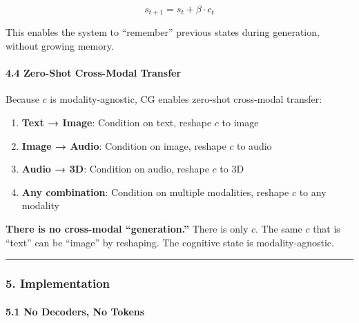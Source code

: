 \documentclass[
  11pt,
  a4paper,
]{article}
\providecommand{\tightlist}{%
  \setlength{\itemsep}{0pt}\setlength{\parskip}{0pt}}
\begin{document}
\[
s_{t+1} = s_t + \beta \cdot c_t
\]

This enables the system to ``remember'' previous states during
generation, without growing memory.

\paragraph{4.4 Zero-Shot Cross-Modal
Transfer}\label{zero-shot-cross-modal-transfer}

Because \(c\) is modality-agnostic, CG enables zero-shot cross-modal
transfer:

\begin{enumerate}
\def\labelenumi{\arabic{enumi}.}
\tightlist
\item
  \textbf{Text → Image}: Condition on text, reshape \(c\) to image
\item
  \textbf{Image → Audio}: Condition on image, reshape \(c\) to audio
\item
  \textbf{Audio → 3D}: Condition on audio, reshape \(c\) to 3D
\item
  \textbf{Any combination}: Condition on multiple modalities, reshape
  \(c\) to any modality
\end{enumerate}

\textbf{There is no cross-modal ``generation.''} There is only \(c\).
The same \(c\) that is ``text'' can be ``image'' by reshaping. The
cognitive state is modality-agnostic.

\begin{center}\rule{0.5\linewidth}{0.5pt}\end{center}

\subsubsection{5. Implementation}\label{implementation}

\paragraph{5.1 No Decoders, No Tokens}\label{no-decoders-no-tokens}
\end{document}
